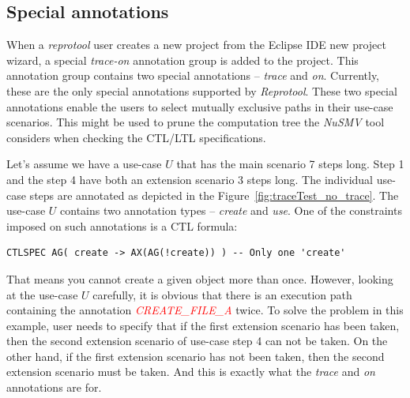 \subsection{Special annotations}

When a \emph{reprotool} user creates a new project from the Eclipse \ac{IDE} new project wizard, a special \emph{trace-on} annotation group is added to the project.
This annotation group contains two special annotations -- \emph{trace} and \emph{on}.
Currently, these are the only special annotations supported by \emph{Reprotool}.
These two special annotations enable the users to select mutually exclusive paths in their use-case scenarios.
This might be used to prune the computation tree the \emph{NuSMV} tool considers when checking the \ac{CTL}/\ac{LTL} specifications.

Let's assume we have a use-case $U$ that has the main scenario 7 steps long.
Step 1 and the step 4 have both an extension scenario 3 steps long.
The individual use-case steps are annotated as depicted in the Figure~\ref{fig:traceTest_no_trace}.
The use-case $U$ contains two annotation types -- \emph{create} and \emph{use}.
One of the constraints imposed on such annotations is a \ac{CTL} formula:
\begin{verbatim}
CTLSPEC AG( create -> AX(AG(!create)) ) -- Only one 'create'
\end{verbatim}

That means you cannot create a given object more than once. However, looking at the use-case $U$ carefully, it is obvious that there is an execution path containing  the annotation \textcolor{red}{\emph{CREATE\_FILE\_A}} twice.
To solve the problem in this example, user needs to specify that if the first extension scenario has been taken, then the second extension scenario of use-case step 4 can not be taken. On the other hand, if the first extension scenario has not been taken,
then the second extension scenario must be taken.
And this is exactly what the \emph{trace} and \emph{on} annotations are for.

\newpage

